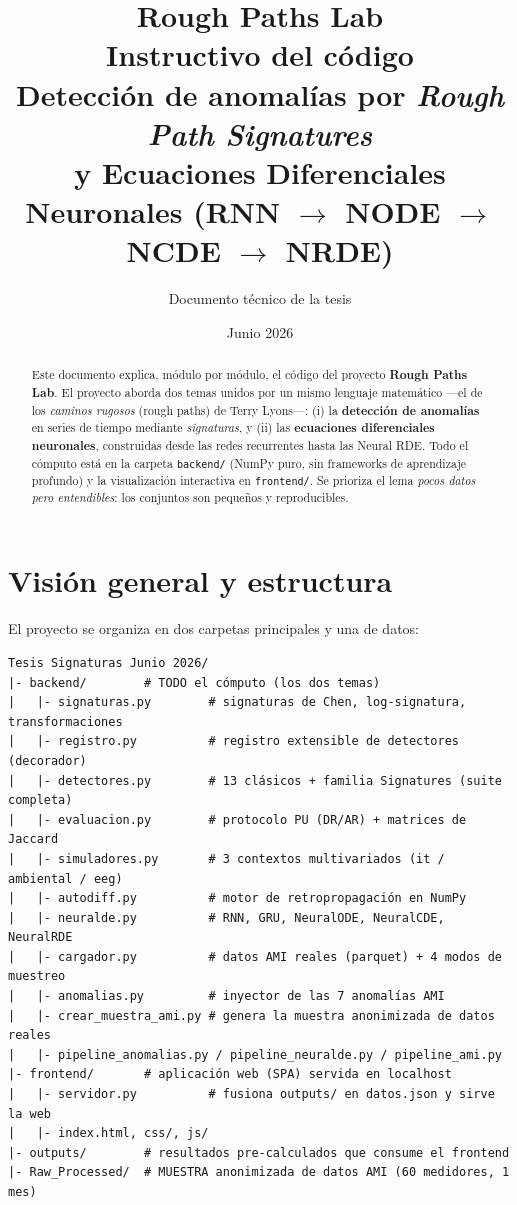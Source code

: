 \documentclass[11pt,a4paper]{article}
\title{\textbf{Rough Paths Lab}\\[4pt]
  \large Instructivo del código\\[10pt]
  \normalsize Detección de anomalías por \emph{Rough Path Signatures}\\
  y Ecuaciones Diferenciales Neuronales (RNN $\to$ NODE $\to$ NCDE $\to$ NRDE)}
\author{Documento técnico de la tesis}
\date{Junio 2026}
\begin{document}
\maketitle
\thispagestyle{empty}

\begin{abstract}
\noindent
Este documento explica, módulo por módulo, el código del proyecto
\textbf{Rough Paths Lab}. El proyecto aborda dos temas unidos por un mismo
lenguaje matemático ---el de los \emph{caminos rugosos} (rough paths) de
Terry Lyons---: (i) la \textbf{detección de anomalías} en series de tiempo
mediante \emph{signaturas}, y (ii) las \textbf{ecuaciones diferenciales
neuronales}, construidas desde las redes recurrentes hasta las Neural RDE.
Todo el cómputo está en la carpeta \texttt{backend/} (NumPy puro, sin
frameworks de aprendizaje profundo) y la visualización interactiva en
\texttt{frontend/}. Se prioriza el lema \emph{pocos datos pero entendibles}:
los conjuntos son pequeños y reproducibles.
\end{abstract}

\tableofcontents
\newpage

\section{Visión general y estructura}

El proyecto se organiza en dos carpetas principales y una de datos:

\begin{lstlisting}[numbers=none]
Tesis Signaturas Junio 2026/
|- backend/        # TODO el cómputo (los dos temas)
|   |- signaturas.py        # signaturas de Chen, log-signatura, transformaciones
|   |- registro.py          # registro extensible de detectores (decorador)
|   |- detectores.py        # 13 clásicos + familia Signatures (suite completa)
|   |- evaluacion.py        # protocolo PU (DR/AR) + matrices de Jaccard
|   |- simuladores.py       # 3 contextos multivariados (it / ambiental / eeg)
|   |- autodiff.py          # motor de retropropagación en NumPy
|   |- neuralde.py          # RNN, GRU, NeuralODE, NeuralCDE, NeuralRDE
|   |- cargador.py          # datos AMI reales (parquet) + 4 modos de muestreo
|   |- anomalias.py         # inyector de las 7 anomalías AMI
|   |- crear_muestra_ami.py # genera la muestra anonimizada de datos reales
|   |- pipeline_anomalias.py / pipeline_neuralde.py / pipeline_ami.py
|- frontend/       # aplicación web (SPA) servida en localhost
|   |- servidor.py          # fusiona outputs/ en datos.json y sirve la web
|   |- index.html, css/, js/
|- outputs/        # resultados pre-calculados que consume el frontend
|- Raw_Processed/  # MUESTRA anonimizada de datos AMI (60 medidores, 1 mes)
\end{lstlisting}
\end{document}

